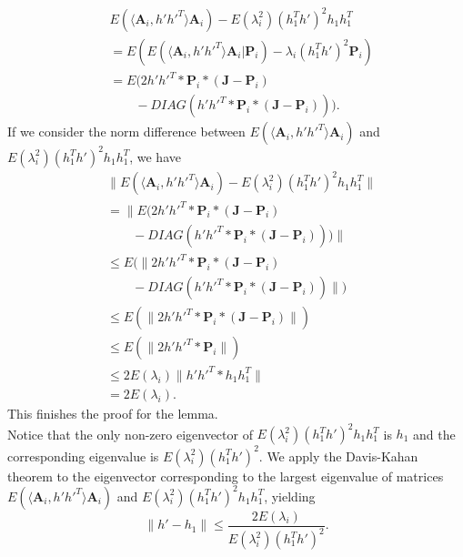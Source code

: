 \documentclass[10pt,journal,compsoc]{IEEEtran}
\newenvironment{proof}[1][Proof]{\begin{trivlist}
		\item[\hskip \labelsep {\bfseries #1}]}{\end{trivlist}}
\newcommand{\bA}{\mathbf{A}}
\newcommand{\bP}{\mathbf{P}}
\newcommand{\bJ}{\mathbf{J}}
\begin{document}
\begin{proof} [Proof of Theorem 4.2]
	\begin{align*}
	&E(\langle \bA_{i},h' h'^T \rangle \bA_{i}) - E(\lambda_i^2) (h_1^Th')^2 h_1 h_1^T \\
	&=E(E(\langle \bA_{i},h' h'^T \rangle \bA_{i}|\bP_i)-\lambda_i (h_1^Th')^2 \bP_i) 
	 \\
	&= E(2 h' h'^T *\bP_i*(\bJ-\bP_i) \\
	&\qquad {}- DIAG(h' h'^T*\bP_i*(\bJ-\bP_i))).
	\end{align*}
	If we consider the norm difference between $E( \langle \bA_{i},h' h'^T \rangle \bA_{i})$ and $ E(\lambda_i^2) (h_1^Th')^2 h_1 h_1^T$, we have
	\begin{align*}
	&\|E(\langle \bA_{i},h' h'^T \rangle \bA_{i} ) - E(\lambda_i^2) (h_1^Th')^2 h_1 h_1^T\| \\
	&= \|E(2 h' h'^T *\bP_i*(\bJ-\bP_i)  \\
	&\qquad - DIAG(h' h'^T*\bP_i*(\bJ-\bP_i)))\| \\
	&\leq  E(\|2 h' h'^T *\bP_i*(\bJ-\bP_i)  \\
	&\qquad - DIAG(h' h'^T*\bP_i*(\bJ-\bP_i))\|) \\
	&\leq  E(\|2 h' h'^T *\bP_i*(\bJ-\bP_i)\|) \\
	&\leq  E(\|2 h' h'^T * \bP_i\|) \\
	&\leq  2 E(\lambda_i)\| h' h'^T * h_1 h_1^T\| \\
	&=  2 E(\lambda_i) .
	\end{align*}
	This finishes the proof for the lemma. \\
	
	\noindent Notice that the only non-zero eigenvector of $E(\lambda_i^2) (h_1^Th')^2 h_1 h_1^T$ is $h_1$ and the corresponding eigenvalue is $E(\lambda_i^2) (h_1^Th')^2$. We apply the Davis-Kahan theorem \cite{davis1970rotation} to the eigenvector corresponding to the largest eigenvalue of matrices $E(\langle \bA_{i},h' h'^T \rangle \bA_{i} )$ and $E(\lambda_i^2) (h_1^Th')^2 h_1 h_1^T$, yielding
	\[\|h'-h_1\| \leq \frac{2 E(\lambda_i)}{E(\lambda_i^2)(h_1^T h')^2}. \]
	
\end{proof}
\end{document}
